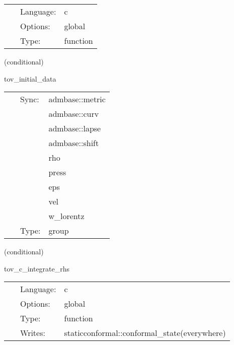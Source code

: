 \begin{tabular*}{160mm}{cll} 
~ & Language:  & c \\ 
~ & Options:  & global \\ 
~ & Type:  & function \\ 
\end{tabular*} 


\vspace{5mm}

   (conditional) 

\hspace{5mm} tov\_initial\_data 

\hspace{5mm}{\it group for the tov initial data } 


\hspace{5mm}

 \begin{tabular*}{160mm}{cll} 
~ & Sync:  & admbase::metric \\ 
~& ~ &admbase::curv\\ 
~& ~ &admbase::lapse\\ 
~& ~ &admbase::shift\\ 
~& ~ &rho\\ 
~& ~ &press\\ 
~& ~ &eps\\ 
~& ~ &vel\\ 
~& ~ &w\_lorentz\\ 
~ & Type:  & group \\ 
\end{tabular*} 


\vspace{5mm}

   (conditional) 

\hspace{5mm} tov\_c\_integrate\_rhs 

\hspace{5mm}{\it integrate the 1d equations for the tov star } 


\hspace{5mm}

 \begin{tabular*}{160mm}{cll} 
~ & Language:  & c \\ 
~ & Options:  & global \\ 
~ & Type:  & function \\ 
~ & Writes:  & staticconformal::conformal\_state(everywhere) \\ 
\end{tabular*} 


